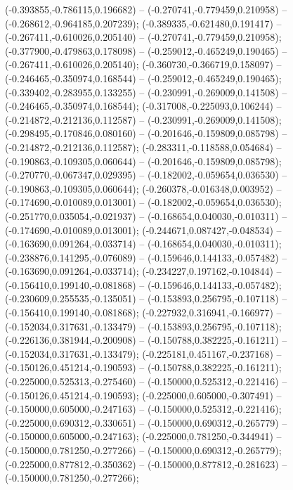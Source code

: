  (-0.393855,-0.786115,0.196682) -- (-0.270741,-0.779459,0.210958) -- (-0.268612,-0.964185,0.207239);
 (-0.389335,-0.621480,0.191417) -- (-0.267411,-0.610026,0.205140) -- (-0.270741,-0.779459,0.210958);
 (-0.377900,-0.479863,0.178098) -- (-0.259012,-0.465249,0.190465) -- (-0.267411,-0.610026,0.205140);
 (-0.360730,-0.366719,0.158097) -- (-0.246465,-0.350974,0.168544) -- (-0.259012,-0.465249,0.190465);
 (-0.339402,-0.283955,0.133255) -- (-0.230991,-0.269009,0.141508) -- (-0.246465,-0.350974,0.168544);
 (-0.317008,-0.225093,0.106244) -- (-0.214872,-0.212136,0.112587) -- (-0.230991,-0.269009,0.141508);
 (-0.298495,-0.170846,0.080160) -- (-0.201646,-0.159809,0.085798) -- (-0.214872,-0.212136,0.112587);
 (-0.283311,-0.118588,0.054684) -- (-0.190863,-0.109305,0.060644) -- (-0.201646,-0.159809,0.085798);
 (-0.270770,-0.067347,0.029395) -- (-0.182002,-0.059654,0.036530) -- (-0.190863,-0.109305,0.060644);
 (-0.260378,-0.016348,0.003952) -- (-0.174690,-0.010089,0.013001) -- (-0.182002,-0.059654,0.036530);
 (-0.251770,0.035054,-0.021937) -- (-0.168654,0.040030,-0.010311) -- (-0.174690,-0.010089,0.013001);
 (-0.244671,0.087427,-0.048534) -- (-0.163690,0.091264,-0.033714) -- (-0.168654,0.040030,-0.010311);
 (-0.238876,0.141295,-0.076089) -- (-0.159646,0.144133,-0.057482) -- (-0.163690,0.091264,-0.033714);
 (-0.234227,0.197162,-0.104844) -- (-0.156410,0.199140,-0.081868) -- (-0.159646,0.144133,-0.057482);
 (-0.230609,0.255535,-0.135051) -- (-0.153893,0.256795,-0.107118) -- (-0.156410,0.199140,-0.081868);
 (-0.227932,0.316941,-0.166977) -- (-0.152034,0.317631,-0.133479) -- (-0.153893,0.256795,-0.107118);
 (-0.226136,0.381944,-0.200908) -- (-0.150788,0.382225,-0.161211) -- (-0.152034,0.317631,-0.133479);
 (-0.225181,0.451167,-0.237168) -- (-0.150126,0.451214,-0.190593) -- (-0.150788,0.382225,-0.161211);
 (-0.225000,0.525313,-0.275460) -- (-0.150000,0.525312,-0.221416) -- (-0.150126,0.451214,-0.190593);
 (-0.225000,0.605000,-0.307491) -- (-0.150000,0.605000,-0.247163) -- (-0.150000,0.525312,-0.221416);
 (-0.225000,0.690312,-0.330651) -- (-0.150000,0.690312,-0.265779) -- (-0.150000,0.605000,-0.247163);
 (-0.225000,0.781250,-0.344941) -- (-0.150000,0.781250,-0.277266) -- (-0.150000,0.690312,-0.265779);
 (-0.225000,0.877812,-0.350362) -- (-0.150000,0.877812,-0.281623) -- (-0.150000,0.781250,-0.277266);
